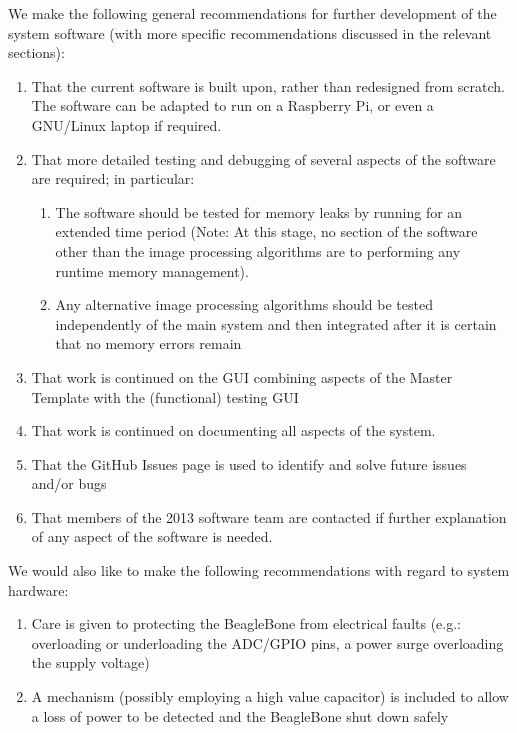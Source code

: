 We make the following general recommendations for further development of the system software (with more specific recommendations discussed in the relevant sections):
\begin{enumerate}
	\item That the current software is built upon, rather than redesigned from scratch. The software can be adapted to run on a Raspberry Pi, or even a GNU/Linux laptop if required.
	\item That more detailed testing and debugging of several aspects of the software are required; in particular:
	\begin{enumerate}
		\item The software should be tested for memory leaks by running for an extended time period (Note: At this stage, no section of the software other than the image processing algorithms are to performing any runtime memory management).
		\item Any alternative image processing algorithms should be tested independently of the main system and then integrated after it is certain that no memory errors remain
	\end{enumerate}
	\item That work is continued on the GUI combining aspects of the Master Template with the (functional) testing GUI
	\item That work is continued on documenting all aspects of the system.
	\item That the GitHub Issues page\cite{github_issues} is used to identify and solve future issues and/or bugs
	\item That members of the 2013 software team are contacted if further explanation of any aspect of the software is needed.
\end{enumerate}

We would also like to make the following recommendations with regard to system hardware:
\begin{enumerate}
	\item Care is given to protecting the BeagleBone from electrical faults (e.g.: overloading or underloading the ADC/GPIO pins, a power surge overloading the supply voltage)
	\item A mechanism (possibly employing a high value capacitor) is included to allow a loss of power to be detected and the BeagleBone shut down safely
\end{enumerate}



